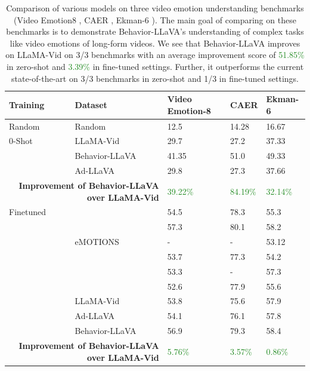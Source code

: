 \begin{table}
\centering
\begin{adjustbox}{width=\textwidth}
\begin{tabular}{ll|lll}
\toprule[1.2pt]
\textbf{Training} & \textbf{Dataset} & \textbf{Video Emotion-8} & \textbf{CAER}  &\textbf{Ekman-6}\\ \midrule[1.2pt]
Random & Random & 12.5 & 14.28 & 16.67 \\\hline
0-Shot& LLaMA-Vid & 29.7 & 27.2  & 37.33 \\ 
& Behavior-LLaVA & 41.35  & 51.0   & 49.33 \\ 
& Ad-LLaVA & 29.8  & 27.3 & 37.66 \\ 
\cline{2-5}
\multicolumn{2}{r|}{\textbf{Improvement of Behavior-LLaVA over LLaMA-Vid}} & \textcolor{ForestGreen}{39.22\%}& \textcolor{ForestGreen}{84.19\%}& \textcolor{ForestGreen}{32.14\%}\\
\hline
Finetuned & \citet{zhao2020end} & 54.5 & 78.3 & 55.3 \\
& \citet{zhang2023weakly}  & 57.3  & 80.1 & 58.2\\ 
& eMOTIONS \cite{wu2023emotions} &- &- & 53.12\\
& \citet{arevalo2017gated} &53.7 & 77.3 & 54.2\\
& \citet{qiu2020dual} & 53.3 & - & 57.3\\
& \citet{xu2016heterogeneous} & 52.6 & 77.9 & 55.6 \\
& LLaMA-Vid & 53.8  & 75.6 & 57.9 \\
& Ad-LLaVA & 54.1  & 76.1 & 57.8 \\
& Behavior-LLaVA & 56.9  & 79.3 & 58.4 \\\cline{2-5}
\multicolumn{2}{r|}{\textbf{Improvement of Behavior-LLaVA over LLaMA-Vid}} & \textcolor{ForestGreen}{5.76\%}& \textcolor{ForestGreen}{3.57\%}& \textcolor{ForestGreen}{0.86\%}\\
\bottomrule[1.2pt]
\end{tabular}
\end{adjustbox}
\caption{Comparison of various models on three video emotion understanding benchmarks (Video Emotion8 \cite{jiang2014predicting}, CAER \cite{lee2019context}, Ekman-6 \cite{xu2016heterogeneous}). The main goal of comparing on these benchmarks is to demonstrate Behavior-LLaVA's understanding of complex tasks like video emotions of long-form videos. We see that Behavior-LLaVA improves on LLaMA-Vid on 3/3 benchmarks with an average improvement score of \textcolor{ForestGreen}{51.85\%} in zero-shot and \textcolor{ForestGreen}{3.39\%} in fine-tuned settings. Further, it outperforms the current state-of-the-art on 3/3 benchmarks in zero-shot and 1/3 in fine-tuned settings.}
\label{tab:video-emotion}
\end{table}




